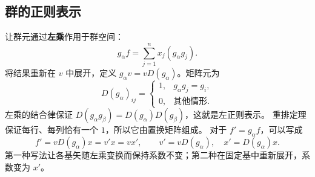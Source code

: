 \subsection{群的正则表示}
让群元通过\textbf{左乘}作用于群空间：
\begin{equation}
g_\alpha f=\sum_{j=1}^{n}x_j\left(g_\alpha g_j\right).
\end{equation}
将结果重新在 $v$ 中展开，定义 $g_\alpha v=vD\left(g_\alpha\right)$。矩阵元为
\begin{equation}
D\left(g_\alpha\right)_{ij}=\begin{cases}1,&g_\alpha g_j=g_i,\\0,&\text{其他情形}.
\end{cases}
\end{equation}
左乘的结合律保证 $D\left(g_\alpha g_\beta\right)=D\left(g_\alpha\right)D\left(g_\beta\right)$，这就是左正则表示。
重排定理保证每行、每列恰有一个 $1$，所以它由置换矩阵组成。
对于 $f'=g_\alpha f$，可以写成
\begin{equation}
f'=vD\left(g_\alpha\right)x=v'x=vx',\qquad
v'=vD\left(g_\alpha\right),\quad x'=D\left(g_\alpha\right)x.
\end{equation}
第一种写法让各基矢随左乘变换而保持系数不变；第二种在固定基中重新展开，系数变为 $x'$。

